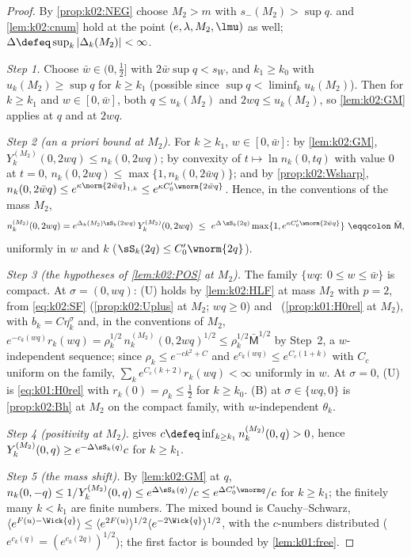 \begin{proof}
By \cref{prop:k02:NEG} choose $M_2>m$ with $s_-(M_2)>\sup q$.  and \cref{lem:k02:cnum} hold at the point $(e,\lambda,M_2,\lmu)$ as well; $\Delta\defeq\sup_k|\Delta_k(M_2)|<\infty$.

\emph{Step 1.} Choose $\bar w\in(0,\frac12]$ with $2\bar w\sup q<s_W$, and $k_1\ge k_0$ with $u_k(M_2)\ge\sup q$ for $k\ge k_1$ (possible since $\sup q<\liminf_ku_k(M_2)$). Then for $k\ge k_1$ and $w\in[0,\bar w]$, both $q\le u_k(M_2)$ and $2wq\le u_k(M_2)$, so \cref{lem:k02:GM} applies at $q$ and at $2wq$.

\emph{Step 2 (an a priori bound at $M_2$).} For $k\ge k_1$, $w\in[0,\bar w]$: by \cref{lem:k02:GM}, $Y^{(M_2)}_k(0,2wq)\le n_k(0,2wq)$; by convexity of $t\mapsto\ln n_k(0,tq)$ with value $0$ at $t=0$, $n_k(0,2wq)\le\max\{1,n_k(0,2\bar wq)\}$; and by \cref{prop:k02:Wsharp}, $n_k(0,2\bar wq)\le e^{\kappa\norm{2\bar wq}_{1,k}}\le e^{\kappa C_0'\wnorm{2\bar wq}}$. Hence, in the conventions of the mass $M_2$,
\[
n^{(M_2)}_k(0,2wq)=e^{\Delta_k(M_2)\sS_k(2wq)}\,Y^{(M_2)}_k(0,2wq)\ \le\ e^{\Delta\,\sS_k(2q)}\max\{1,e^{\kappa C_0'\wnorm{2\bar wq}}\}\ \eqqcolon\ \bar{\mathsf M},
\]
uniformly in $w$ and $k$ ($\sS_k(2q)\le C_0'\wnorm{2q}$).

\emph{Step 3 (the hypotheses of \cref{lem:k02:POS} at $M_2$).} The family $\{wq:\ 0\le w\le\bar w\}$ is compact. At $\sigma=(0,wq)$: (U) holds by \cref{lem:k02:HLF} at mass $M_2$ with $p=2$, from \eqref{eq:k02:SF} (\cref{prop:k02:Uplus} at $M_2$; $wq\ge0$) and \Rzero\ (\cref{prop:k01:H0rel} at $M_2$), with $b_k=C\eta_k^\sigma$ and, in the conventions of $M_2$, $e^{-c_k(wq)}r_k(wq)=\rho_k^{1/2}\,n^{(M_2)}_k(0,2wq)^{1/2}\le\rho_k^{1/2}\bar{\mathsf M}^{1/2}$ by Step~2, a $w$-independent sequence; since $\rho_k\le e^{-ck^2+C}$ and $e^{c_k(wq)}\le e^{C_c(1+k)}$ with $C_c$ uniform on the family, $\sum_ke^{C_c(k+2)}r_k(wq)<\infty$ uniformly in $w$. At $\sigma=0$, (U) is \eqref{eq:k01:H0rel} with $r_k(0)=\rho_k\le\frac12$ for $k\ge k_0$. (B) at $\sigma\in\{wq,0\}$ is \cref{prop:k02:Bh} at $M_2$ on the compact family, with $w$-independent $\theta_k$.

\emph{Step 4 (positivity at $M_2$).}  gives $c\defeq\inf_{k\ge k_1}n^{(M_2)}_k(0,q)>0$, hence $Y^{(M_2)}_k(0,q)\ge e^{-\Delta\sS_k(q)}c$ for $k\ge k_1$.

\emph{Step 5 (the mass shift).} By \cref{lem:k02:GM} at $q$, $n_k(0,-q)\le1/Y^{(M_2)}_k(0,q)\le e^{\Delta\sS_k(q)}/c\le e^{\Delta C_0'\wnorm q}/c$ for $k\ge k_1$; the finitely many $k<k_1$ are finite numbers. The mixed bound is Cauchy--Schwarz, $\langle e^{F(u)-\Wick{q}}\rangle\le\langle e^{2F(u)}\rangle^{1/2}\langle e^{-2\Wick{q}}\rangle^{1/2}$, with the $c$-numbers distributed ($e^{c_k(q)}=(e^{c_k(2q)})^{1/2}$); the first factor is bounded by \cref{lem:k01:free}.
\end{proof}


